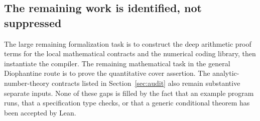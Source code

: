 \subsection{The remaining work is identified, not suppressed}

The large remaining formalization task is to construct the deep
arithmetic proof terms for the local mathematical contracts and the
numerical coding library, then instantiate the compiler. The remaining
mathematical task in the general Diophantine route is to prove the
quantitative cover assertion. The analytic-number-theory contracts listed
in Section~\ref{sec:audit} also remain substantive separate inputs.
None of these gaps is filled by the fact that an example program runs,
that a specification type checks, or that a generic conditional theorem
has been accepted by Lean.
